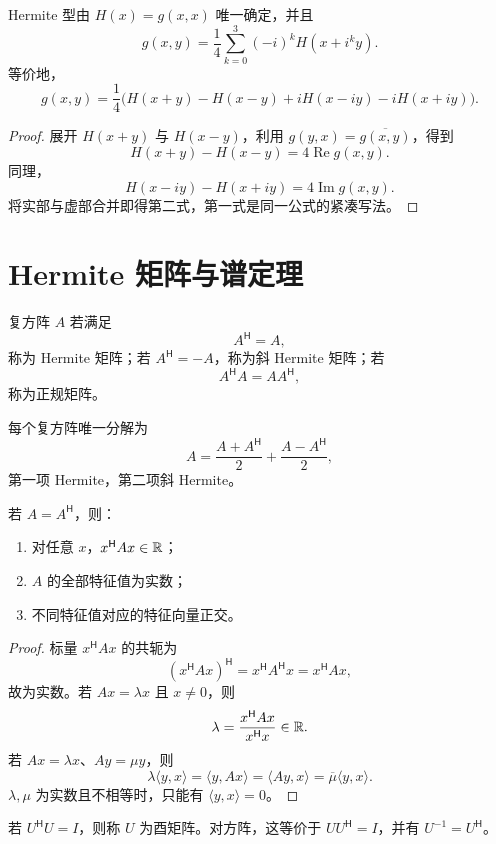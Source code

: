 \begin{theorem}[复极化恒等式]
Hermite 型由 $H(x)=g(x,x)$ 唯一确定，并且
\[
g(x,y)=\frac14\sum_{k=0}^3 (-i)^kH(x+i^ky).
\]
等价地，
\[
g(x,y)=\frac14\bigl(H(x+y)-H(x-y)
+iH(x-iy)-iH(x+iy)\bigr).
\]
\end{theorem}
\begin{proof}
展开 $H(x+y)$ 与 $H(x-y)$，利用
$g(y,x)=\overline{g(x,y)}$，得到
\[
H(x+y)-H(x-y)=4\operatorname{Re}g(x,y).
\]
同理，
\[
H(x-iy)-H(x+iy)=4\operatorname{Im}g(x,y).
\]
将实部与虚部合并即得第二式，第一式是同一公式的紧凑写法。
\end{proof}

\section{Hermite 矩阵与谱定理}

\begin{definition}
复方阵 $A$ 若满足
\[
A^{\mathsf H}=A,
\]
称为 Hermite 矩阵；若 $A^{\mathsf H}=-A$，称为斜 Hermite 矩阵；若
\[
A^{\mathsf H}A=AA^{\mathsf H},
\]
称为正规矩阵。
\end{definition}

每个复方阵唯一分解为
\[
A=\frac{A+A^{\mathsf H}}2+\frac{A-A^{\mathsf H}}2,
\]
第一项 Hermite，第二项斜 Hermite。

\begin{proposition}
若 $A=A^{\mathsf H}$，则：
\begin{enumerate}
\item 对任意 $x$，$x^{\mathsf H}Ax\in\mathbb{R}$；
\item $A$ 的全部特征值为实数；
\item 不同特征值对应的特征向量正交。
\end{enumerate}
\end{proposition}
\begin{proof}
标量 $x^{\mathsf H}Ax$ 的共轭为
\[
(x^{\mathsf H}Ax)^{\mathsf H}=x^{\mathsf H}A^{\mathsf H}x
=x^{\mathsf H}Ax,
\]
故为实数。若 $Ax=\lambda x$ 且 $x\ne0$，则
\[
\lambda=\frac{x^{\mathsf H}Ax}{x^{\mathsf H}x}\in\mathbb{R}.
\]
若 $Ax=\lambda x$、$Ay=\mu y$，则
\[
\lambda\langle y,x\rangle
=\langle y,Ax\rangle
=\langle Ay,x\rangle
=\overline\mu\langle y,x\rangle.
\]
$\lambda,\mu$ 为实数且不相等时，只能有 $\langle y,x\rangle=0$。
\end{proof}

\begin{definition}[酉矩阵]
若 $U^{\mathsf H}U=I$，则称 $U$ 为酉矩阵。对方阵，这等价于
$UU^{\mathsf H}=I$，并有 $U^{-1}=U^{\mathsf H}$。
\end{definition}

